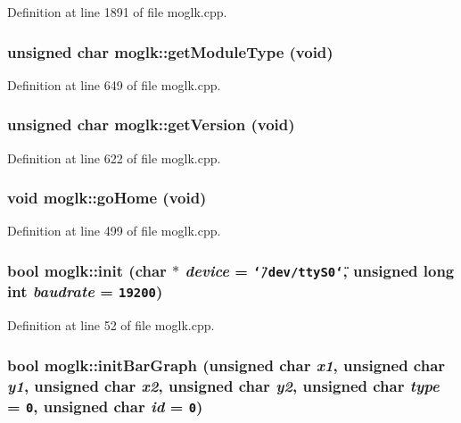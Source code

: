 Definition at line 1891 of file moglk.cpp.\hypertarget{classmoglk_9fffd2e63880a4ea0ecf8e1d9f196668}{
\subsubsection[{getModuleType}]{\setlength{\rightskip}{0pt plus 5cm}unsigned char moglk::getModuleType (void)}}
\label{classmoglk_9fffd2e63880a4ea0ecf8e1d9f196668}




Definition at line 649 of file moglk.cpp.\hypertarget{classmoglk_353d736b01087f171ceb14a7a01cd292}{
\subsubsection[{getVersion}]{\setlength{\rightskip}{0pt plus 5cm}unsigned char moglk::getVersion (void)}}
\label{classmoglk_353d736b01087f171ceb14a7a01cd292}




Definition at line 622 of file moglk.cpp.\hypertarget{classmoglk_1f33a99d62509dfd98ca6898ba5a228e}{
\subsubsection[{goHome}]{\setlength{\rightskip}{0pt plus 5cm}void moglk::goHome (void)}}
\label{classmoglk_1f33a99d62509dfd98ca6898ba5a228e}




Definition at line 499 of file moglk.cpp.\hypertarget{classmoglk_2b26bc8f68f3b4efcac9d1e6d902b695}{
\subsubsection[{init}]{\setlength{\rightskip}{0pt plus 5cm}bool moglk::init (char $\ast$ {\em device} = {\tt \char`\"{}/dev/ttyS0\char`\"{}}, \/  unsigned long int {\em baudrate} = {\tt 19200})}}
\label{classmoglk_2b26bc8f68f3b4efcac9d1e6d902b695}




Definition at line 52 of file moglk.cpp.\hypertarget{classmoglk_cf20f143dc45f7cffd9cde3de54ea8aa}{
\subsubsection[{initBarGraph}]{\setlength{\rightskip}{0pt plus 5cm}bool moglk::initBarGraph (unsigned char {\em x1}, \/  unsigned char {\em y1}, \/  unsigned char {\em x2}, \/  unsigned char {\em y2}, \/  unsigned char {\em type} = {\tt 0}, \/  unsigned char {\em id} = {\tt 0})}}
\label{classmoglk_cf20f143dc45f7cffd9cde3de54ea8aa}




